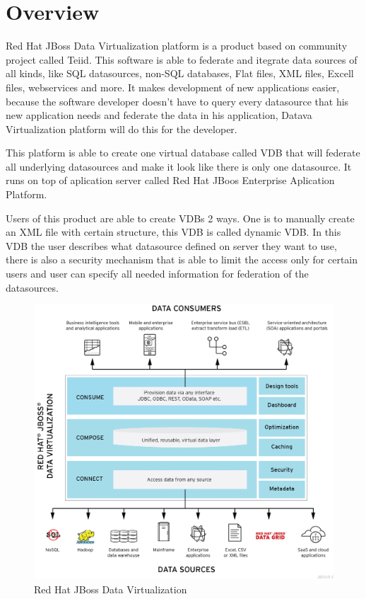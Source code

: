 \documentclass[12pt,oneside]{fithesis2}
\begin{document}
\section{Overview}
\par Red Hat JBoss Data Virtualization platform is a product based on community project called Teiid.  This software is able to federate and itegrate data sources of all kinds, like SQL datasources, non-SQL databases, Flat files, XML files, Excell files, webservices and more. It makes development of new applications easier, because the software developer doesn't have to query every datasource that his new application needs and federate the data in his application, Datava Virtualization platform will do this for the developer.
\par This platform is able to create one virtual database called VDB that will federate all underlying datasources and make it look like there is only one datasource. It runs on top of aplication server called Red Hat JBoos Enterprise Aplication Platform.
\par Users of this product are able to create VDBs 2 ways. One is to manually create an XML file with certain structure, this VDB is called dynamic VDB. In this VDB the user describes what datasource defined on server they want to use, there is also a security mechanism that is able to limit the access only for certain users and user can specify all needed information for federation of the datasources.
\begin{figure}[H]
\caption{Red Hat JBoss Data Virtualization}
\label{fig:dv}
\centering
\vspace{5mm}
\includegraphics[scale=0.15]{dv} 
\end{figure} 
\end{document}
